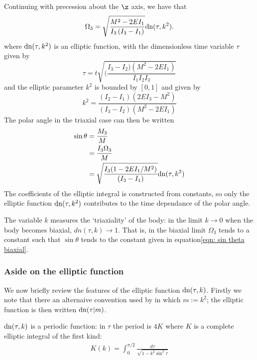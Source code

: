 \documentclass[/home/greg/Thesis/main/main.tex]{subfiles}
\begin{document}
Continuing with precession about the $\z$ axis, we have that
\begin{equation}
    \Omega_{3} = \sqrt{\frac{M^{2} - 2EI_{1}}{I_{3}\left(I_{3} - I_{1}\right)}} 
                 \mathrm{dn}(\tau , k^{2}).
\end{equation}
where $\mathrm{dn}(\tau, k^{2})$ is an elliptic function, with the dimensionless time variable
$\tau$ given by 
\begin{equation}
    \tau = t\sqrt{(\frac{I_{3} - I_{2})(M^{2} - 2EI_{1})}{I_{1}I_{2}I_{3}}}
    \label{eqn: tau t}
\end{equation}
and the elliptic parameter $k^{2}$ is bounded by $[0, 1]$ and given by 
\begin{equation}
    k^{2} = \frac{(I_{2} - I_{1})(2EI_{3} - M^{2})}{(I_{3}-I_{2})(M^{2} - 2EI_{1})}
    \label{eqn: k2}
\end{equation}
The polar angle in the triaxial case can then be written
\begin{align}
    \sin\theta & = \frac{M_{3}}{M} \\
               & = \frac{I_{3}\Omega_{3}}{M} \\
               & = \sqrt{\frac{I_{3}(1 - 2EI_{1}/M^{2})}{\left(I_{3} - I_{1}\right)}} 
                   \mathrm{dn}(\tau, k^{2})
\end{align}
The coefficients of the elliptic integral is constructed from constants, so only
the elliptic function $\mathrm{dn}(\tau, k^{2})$ contributes to the time dependance of the
polar angle. 

The variable $k$ measures the `triaxiality' of the body: in the limit 
$k\rightarrow 0$ when the body becomes biaxial, $dn(\tau, k) \rightarrow 1$. 
That is, in the biaxial limit $\Omega_{3}$ tends to a constant such that
$\sin\theta$ tends to the constant given in equation\eqref{eqn: sin theta biaxial}.

\subsubsection{Aside on the elliptic function}
We now briefly review the features of the elliptic function $\mathrm{dn}(\tau, k)$. 
Firstly we note that there an alternaive convention used by \citet{Abramowitz1972}
in which $m := k^{2}$; the elliptic function is then written $\mathrm{dn}(\tau| m)$. 

$\mathrm{dn}(\tau, k)$ is a periodic function: in $\tau$ the period is $4K$ where 
$K$ is a complete elliptic integral of the first kind:
\begin{align}
    K(k) = \int_{0}^{\pi/2}\frac{d\tau}{\sqrt{1 - k^{2}\sin^{2}\tau}}
\end{align}
\end{document}
